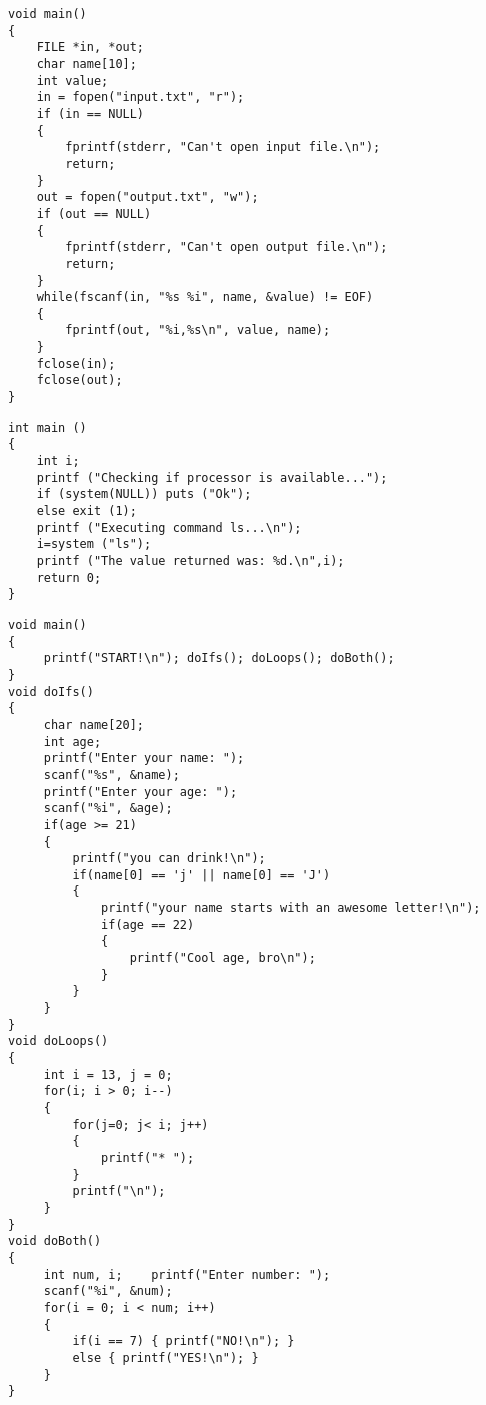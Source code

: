\documentclass{article}
\begin{document}
\begin{algorithm}
\lstset{language=[mips]Assembler}
\caption{Test 2 - File IO}
\begin{lstlisting}
void main()
{
    FILE *in, *out;
    char name[10];
    int value;
    in = fopen("input.txt", "r");
    if (in == NULL)
    {
        fprintf(stderr, "Can't open input file.\n");
        return;
    }
    out = fopen("output.txt", "w");
    if (out == NULL)
    {
        fprintf(stderr, "Can't open output file.\n");
        return;
    }
    while(fscanf(in, "%s %i", name, &value) != EOF)
    {
        fprintf(out, "%i,%s\n", value, name);
    }
    fclose(in);
    fclose(out);
}
\end{lstlisting}
\end{algorithm}

\begin{algorithm}
\lstset{language=[mips]Assembler}
\caption{Test 3 - System Calls}
\begin{lstlisting}
int main ()
{
    int i;
    printf ("Checking if processor is available...");
    if (system(NULL)) puts ("Ok");
    else exit (1);
    printf ("Executing command ls...\n");
    i=system ("ls");
    printf ("The value returned was: %d.\n",i);
    return 0;
}
\end{lstlisting}
\end{algorithm}

\begin{algorithm}
\lstset{language=[mips]Assembler}
\caption{Test 4 - Nested Conditionals}
\begin{lstlisting}
void main()
{
     printf("START!\n"); doIfs(); doLoops(); doBoth();
}
void doIfs()
{
     char name[20];
     int age;
     printf("Enter your name: ");
     scanf("%s", &name);
     printf("Enter your age: ");
     scanf("%i", &age);
     if(age >= 21)
     {
         printf("you can drink!\n");
         if(name[0] == 'j' || name[0] == 'J')
         {
             printf("your name starts with an awesome letter!\n");
             if(age == 22)
             {
                 printf("Cool age, bro\n");
             }
         }
     }
}
void doLoops()
{
     int i = 13, j = 0;
     for(i; i > 0; i--)
     {
         for(j=0; j< i; j++)
         {
             printf("* ");
         }
         printf("\n");
     }
}
void doBoth()
{
     int num, i;    printf("Enter number: ");
     scanf("%i", &num);
     for(i = 0; i < num; i++)
     {
         if(i == 7) { printf("NO!\n"); }
         else { printf("YES!\n"); }
     }
}
\end{lstlisting}
\end{algorithm}
\end{document}
